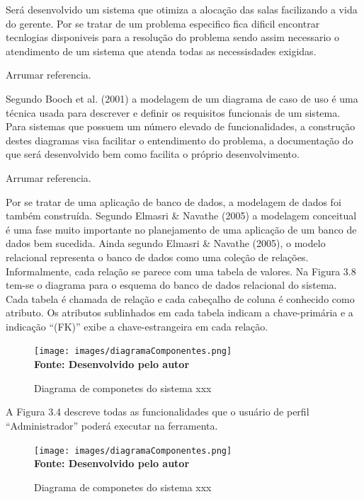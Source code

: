 
Será desenvolvido um sistema que otimiza a alocação das salas facilizando a vida do gerente. Por se tratar de um problema especifico fica dificil encontrar tecnlogias disponiveis para a resolução do problema sendo assim necessario o atendimento de um sistema que atenda todas as necessisdades exigidas.


Arrumar referencia.\par

Segundo Booch et al. (2001) a modelagem de um diagrama de caso de uso é uma
técnica usada para descrever e definir os requisitos funcionais de um sistema. Para sistemas
que possuem um número elevado de funcionalidades, a construção destes diagramas visa
facilitar o entendimento do problema, a documentação do que será desenvolvido bem
como facilita o próprio desenvolvimento.



Arrumar referencia.\par
Por se tratar de uma aplicação de banco de dados, a modelagem de dados foi
também construída. Segundo Elmasri & Navathe (2005) a modelagem conceitual é uma
fase muito importante no planejamento de uma aplicação de um banco de dados bem
sucedida.
Ainda segundo Elmasri & Navathe (2005), o modelo relacional representa o banco
de dados como uma coleção de relações. Informalmente, cada relação se parece com uma
tabela de valores.
Na Figura 3.8 tem-se o diagrama para o esquema do banco de dados relacional do
sistema. Cada tabela é chamada de relação e cada cabeçalho de coluna é conhecido como
atributo. Os atributos sublinhados em cada tabela indicam a chave-primária e a indicação
“(FK)” exibe a chave-estrangeira em cada relação.

\begin{figure}[!htb]
\caption[Diagrama de componetes do sistema xxx]{Diagrama de componetes do sistema xxx}
\label{fig:figura1}
\centering
\texttt{[image: images/diagramaComponentes.png]}
\\ \textbf{\footnotesize Fonte: Desenvolvido pelo autor}
\end{figure}




A Figura 3.4 descreve todas as funcionalidades que o usuário de perfil
“Administrador” poderá executar na ferramenta.


\begin{figure}[!htb]
\caption[Diagrama de componetes do sistema xxx]{Diagrama de componetes do sistema xxx}
\label{fig:figura1}
\centering
\texttt{[image: images/diagramaComponentes.png]}
\\ \textbf{\footnotesize Fonte: Desenvolvido pelo autor}
\end{figure}

